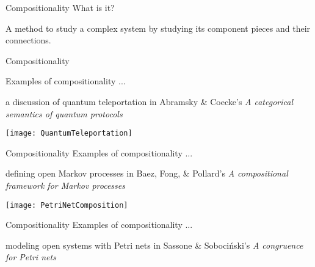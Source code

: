 




\begin{frame}{Compositionality}
	What is it?
	
	\pause
	
	A method to study a complex system
	by studying its component pieces
	and their connections.
	
	
\end{frame}{Compositionality}


\begin{frame}
	
	Examples of compositionality ...
	
	\pause
	
	a discussion of quantum teleportation in
	Abramsky \& Coecke's 
	\emph{A categorical semantics of quantum protocols}
	
	\texttt{[image: QuantumTeleportation]}
	
\end{frame}


\begin{frame}{Compositionality}
	Examples of compositionality ...
	
	\pause
	
	defining open Markov processes
	in Baez, Fong, \& Pollard's
	\emph{A compositional framework
	for Markov processes}
	
	\texttt{[image: PetriNetComposition]}
\end{frame}


\begin{frame}{Compositionality}
	Examples of compositionality ...
	
	\pause
	
	modeling open systems with Petri nets
	in Sassone \& Soboci\'{n}ski's
	\emph{A congruence for Petri nets}
	
	
\end{frame}


